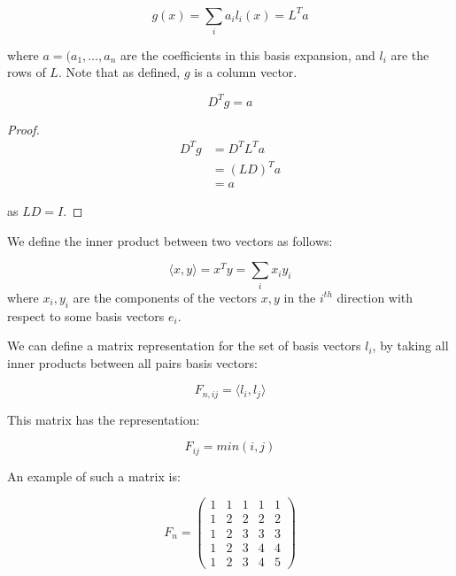 \documentclass{article}
\begin{document}
\begin{equation}
g\left(x\right) = \sum_i a_i l_i\left(x\right) = L^Ta
\label{basis-expansion}
\end{equation}

where \(a = (a_1, \ldots, a_n\) are the coefficients in this basis expansion, and \(l_i\) are the rows of \(L\). Note that as defined, \(g\) is a column vector.

\begin{proposition}
\begin{equation}
D^Tg = a
\end{equation}
\label{def:a}
\end{proposition}
\begin{proof}

\begin{align}
D^Tg &= D^T L^T a \\
&= \left(LD\right)^Ta \\
&= a
\end{align}

as \(LD = I\).

\end{proof}

We define the inner product between two vectors as follows:

\begin{definition}
\begin{equation}
\langle x, y \rangle = x^T y = \sum_i x_i y_i
\end{equation}	
where \(x_i, y_i\) are the components of the vectors \(x,y\) in the \(i^{th}\) direction with respect to some basis vectors \(e_i\).
\end{definition}

We can define a matrix representation for the set of basis vectors \(l_i\), by taking all inner products between all pairs basis vectors:

\begin{definition}
\begin{equation}
F_{n, ij} = \langle l_i, l_j \rangle
\end{equation}

This matrix has the representation:

\begin{equation}
F_{ij} = min(i,j)
\end{equation}

An example of such a matrix is:

\begin{equation}
F_n= \begin{pmatrix}
 1 & 1 & 1 & 1  & 1 \\
  1 & 2 & 2 & 2  & 2\\
     1 & 2 & 3 & 3  & 3  \\
    1 & 2 & 3 & 4  & 4  \\
     1 & 2 & 3 & 4  & 5 
\end{pmatrix}
\label{def:Fmtx}
\end{equation}
\end{definition}
\end{document}
